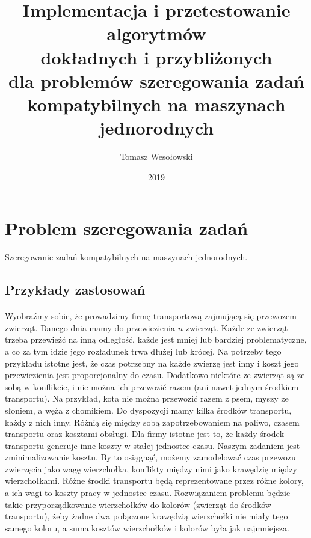 \documentclass{article}
\title{%
	Implementacja i przetestowanie algorytmów \\
	dokładnych i przybliżonych \\
	dla problemów szeregowania zadań \\
	kompatybilnych na maszynach jednorodnych}
\author{Tomasz Wesołowski}
\date{2019}
\begin{document}
 
\maketitle
 
\tableofcontents
 
\section{Problem szeregowania zadań}

Szeregowanie zadań kompatybilnych na maszynach jednorodnych.

\subsection{Przykłady zastosowań}

\paragraph{} Wyobraźmy sobie, że prowadzimy firmę transportową zajmującą się przewozem zwierząt. Danego dnia mamy do przewiezienia $n$ zwierząt. Każde ze zwierząt trzeba przewieźć na inną odległość, każde jest mniej lub bardziej problematyczne, a co za tym idzie jego rozładunek trwa dłużej lub krócej. Na potrzeby tego przykładu istotne jest, że czas potrzebny na każde zwierzę jest inny i koszt jego przewiezienia jest proporcjonalny do czasu. Dodatkowo niektóre ze zwierząt są ze sobą w konflikcie, i nie można ich przewozić razem (ani nawet jednym środkiem transportu). Na przykład, kota nie można przewozić razem z psem, myszy ze słoniem, a węża z chomikiem. Do dyspozycji mamy kilka środków transportu, każdy z nich inny. Różnią się między sobą zapotrzebowaniem na paliwo, czasem transportu oraz kosztami obsługi. Dla firmy istotne jest to, że każdy środek transportu generuje inne koszty w stałej jednostce czasu. Naszym zadaniem jest zminimalizowanie kosztu. By to osiągnąć, możemy zamodelować czas przewozu zwierzęcia jako wagę wierzchołka,  konflikty między nimi jako krawędzię między wierzchołkami. Różne środki transportu będą reprezentowane przez różne kolory, a ich wagi to koszty pracy w jednostce czasu. Rozwiązaniem problemu będzie takie przyporządkowanie wierzchołków do kolorów (zwierząt do środków transportu), żeby żadne dwa połączone krawędzią wierzchołki nie miały tego samego koloru, a suma kosztów wierzchołków i kolorów była jak najmniejsza.
\end{document}
